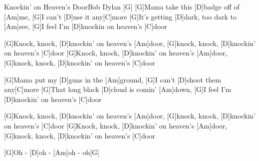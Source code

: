\documentclass[../main.tex]{subfiles}
\begin{document}
\begin{song}{Knockin' on Heaven's Door}{Bob Dylan}{}
[G] \hh[D] \hh[Am] \hh[G] \hh[D] \hh[C]{}
[G]Mama take this [D]badge off of [Am]me, [G]I can't [D]use it any[C]more
[G]It's getting [D]dark, too dark to [Am]see, [G]I feel I'm [D]knockin on heaven's [C]door

[G]Knock, knock, [D]knockin' on heaven's [Am]door, [G]knock, knock, [D]knockin' on heaven's [C]door
[G]Knock, knock, [D]knockin' on heaven's [Am]door, [G]knock, knock, [D]knockin' on heaven's [C]door

[G]Mama put my [D]guns in the [Am]ground, [G]I can't [D]shoot them any[C]more
[G]That long black [D]cloud is comin' [Am]down, [G]I feel I'm [D]knockin' on heaven's [C]door

[G]Knock, knock, [D]knockin' on heaven's [Am]door, [G]knock, knock, [D]knockin' on heaven's [C]door
[G]Knock, knock, [D]knockin' on heaven's [Am]door, [G]knock, knock, [D]knockin' on heaven's [C]door

[G]Oh - [D]oh - [Am]oh - oh[G]{\hh}

\end{song}
\end{document}
